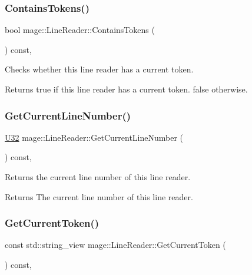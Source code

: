 \subsubsection{\texorpdfstring{Contains\+Tokens()}{ContainsTokens()}}
{\footnotesize\ttfamily bool mage\+::\+Line\+Reader\+::\+Contains\+Tokens (\begin{DoxyParamCaption}{ }\end{DoxyParamCaption}) const\hspace{0.3cm}{\ttfamily [protected]}, {\ttfamily [noexcept]}}

Checks whether this line reader has a current token.

\begin{DoxyReturn}{Returns}
{\ttfamily true} if this line reader has a current token. {\ttfamily false} otherwise. 
\end{DoxyReturn}
\mbox{\label{classmage_1_1_line_reader_aa0ed768e2799b74f2341c56fc6ac4969}} 
\subsubsection{\texorpdfstring{Get\+Current\+Line\+Number()}{GetCurrentLineNumber()}}
{\footnotesize\ttfamily \mbox{\hyperlink{namespacemage_aa5d6eaabaac3cdd01873d6a3d27e90f3}{U32}} mage\+::\+Line\+Reader\+::\+Get\+Current\+Line\+Number (\begin{DoxyParamCaption}{ }\end{DoxyParamCaption}) const\hspace{0.3cm}{\ttfamily [protected]}, {\ttfamily [noexcept]}}

Returns the current line number of this line reader.

\begin{DoxyReturn}{Returns}
The current line number of this line reader. 
\end{DoxyReturn}
\mbox{\label{classmage_1_1_line_reader_a543a1b133b0067cbe69e81dbad5ea0e1}} 
\subsubsection{\texorpdfstring{Get\+Current\+Token()}{GetCurrentToken()}}
{\footnotesize\ttfamily const std\+::string\+\_\+view mage\+::\+Line\+Reader\+::\+Get\+Current\+Token (\begin{DoxyParamCaption}{ }\end{DoxyParamCaption}) const\hspace{0.3cm}{\ttfamily [private]}, {\ttfamily [noexcept]}}

